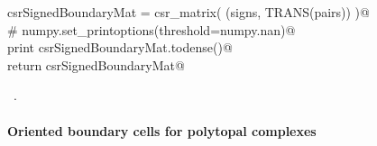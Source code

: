 \documentclass[11pt,oneside]{article}	%
\begin{document}
\begin{flushleft}
\begin{list}{}{}
\mbox{}\verb@   csrSignedBoundaryMat = csr_matrix( (signs, TRANS(pairs)) )@\\
\mbox{}\verb@   # numpy.set_printoptions(threshold=numpy.nan)@\\
\mbox{}\verb@   print csrSignedBoundaryMat.todense()@\\
\mbox{}\verb@   return csrSignedBoundaryMat@\\
\mbox{}\verb@@{\NWsep}
\end{list}
\vspace{-1ex}
\footnotesize\addtolength{\baselineskip}{-1ex}
\begin{list}{}{\setlength{\itemsep}{-\parsep}\setlength{\itemindent}{-\leftmargin}}
\item \NWtxtMacroRefIn\ .
\end{list}
\end{flushleft}

\paragraph{Oriented boundary cells for polytopal complexes}
\end{document}
